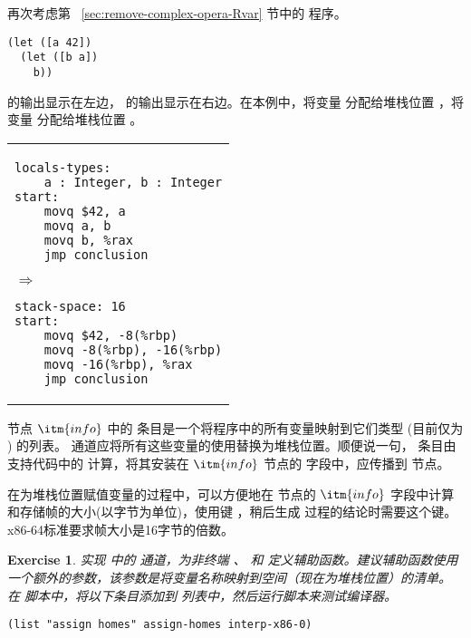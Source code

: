 \documentclass[11pt]{book}
\newtheorem{exercise}[theorem]{Exercise}
\begin{document}
再次考虑第 ~\ref{sec:remove-complex-opera-Rvar} 节中的 \LangVar{} 程序。
\begin{lstlisting}
(let ([a 42])
  (let ([b a])
    b))
\end{lstlisting}
  的输出显示在左边，  的输出显示在右边。在本例中，将变量  分配给堆栈位置  ，将变量  分配给堆栈位置  。\\
\begin{tabular}{l}
  \begin{minipage}{0.4\textwidth}
\begin{lstlisting}[basicstyle=\ttfamily\footnotesize]
locals-types:
    a : Integer, b : Integer
start: 
    movq $42, a
    movq a, b
    movq b, %rax
    jmp conclusion
\end{lstlisting}
\end{minipage}
{$\Rightarrow$}
\begin{minipage}{0.4\textwidth}
\begin{lstlisting}[basicstyle=\ttfamily\footnotesize]
stack-space: 16
start:
    movq $42, -8(%rbp)
    movq -8(%rbp), -16(%rbp)
    movq -16(%rbp), %rax
    jmp conclusion
\end{lstlisting}
\end{minipage}
\end{tabular} 

 节点 $\itm{info}$ 中的  条目是一个将程序中的所有变量映射到它们类型 (目前仅为 ) 的列表。
 通道应将所有这些变量的使用替换为堆栈位置。顺便说一句，  条目由支持代码中的  计算，将其安装在 $\itm{info}$ 节点的  字段中，应传播到  节点。

在为堆栈位置赋值变量的过程中，可以方便地在  节点的 $\itm{info}$ 字段中计算和存储帧的大小(以字节为单位)，使用键  ，稍后生成  过程的结论时需要这个键。x86-64标准要求帧大小是16字节的倍数。

\begin{exercise}\normalfont
实现  中的  通道，为非终端 \Arg{} 、\Instr{} 和
\Block{} 定义辅助函数。建议辅助函数使用一个额外的参数，该参数是将变量名称映射到空间（现在为堆栈位置）的清单。
%
在  脚本中，将以下条目添加到  列表中，然后运行脚本来测试编译器。
\begin{lstlisting}
(list "assign homes" assign-homes interp-x86-0)
\end{lstlisting}
\end{exercise}
\end{document}
